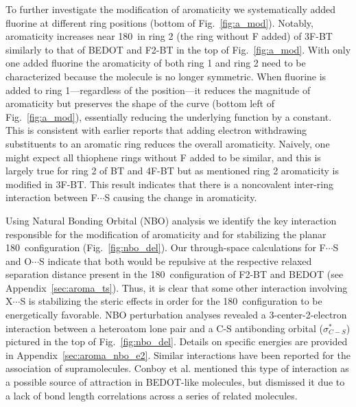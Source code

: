 To further investigate the modification of aromaticity we systematically added fluorine at different ring positions (bottom of Fig.~\ref{fig:a_mod}). Notably, aromaticity increases near 180\textdegree \ in ring 2 (the ring without F added) of 3F-BT similarly to that of BEDOT and F2-BT in the top of Fig.~\ref{fig:a_mod}. With only one added fluorine the aromaticity of both ring 1 and ring 2 need to be characterized because the molecule is no longer symmetric. When fluorine is added to ring 1---regardless of the position---it reduces the magnitude of aromaticity but preserves the shape of the curve (bottom left of Fig.~\ref{fig:a_mod}), essentially reducing the underlying function by a constant. This is consistent with earlier reports that adding electron withdrawing substituents to an aromatic ring reduces the overall aromaticity.\cite{Krygowski2014} Naively, one might expect all thiophene rings without F added to be similar, and this is largely true for ring 2 of BT and 4F-BT but as mentioned ring 2 aromaticity is modified in 3F-BT. This result indicates that there is a noncovalent inter-ring interaction between F$\cdots$S causing the change in aromaticity.

Using Natural Bonding Orbital (NBO) analysis we identify the key interaction responsible for the modification of aromaticity and for stabilizing the planar 180\textdegree \ configuration (Fig.~\ref{fig:nbo_del}). Our through-space calculations for F$\cdots$S and O$\cdots$S indicate that both would be repulsive at the respective relaxed separation distance present in the 180\textdegree \ configuration of F2-BT and BEDOT (see Appendix~\ref{sec:aroma_ts}). Thus, it is clear that some other interaction involving X$\cdots$S is stabilizing the steric effects in order for the 180\textdegree \ configuration to be energetically favorable. NBO perturbation analyses revealed a 3-center-2-electron interaction between a heteroatom lone pair and a C-S antibonding orbital ($\sigma^{*}_{C-S}$) pictured in the top of Fig.~\ref{fig:nbo_del}. Details on specific energies are provided in Appendix~\ref{sec:aroma_nbo_e2}. Similar interactions have been reported for the association of supramolecules.\cite{Cozzolino2005} Conboy et al. mentioned this type of interaction as a possible source of attraction in BEDOT-like molecules, but dismissed it due to a lack of bond length correlations across a series of related molecules.\cite{Conboy2016}

